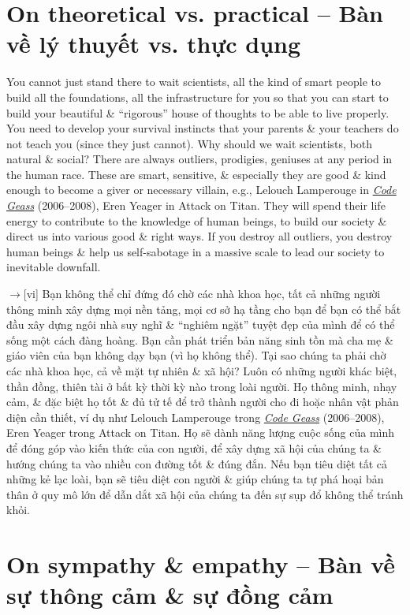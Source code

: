\documentclass[12pt,twoside]{book}
\begin{document}
\section{On theoretical vs. practical -- Bàn về lý thuyết vs. thực dụng}
You cannot just stand there to wait scientists, all the kind of smart people to build all the foundations, all the infrastructure for you so that you can start to build your beautiful \& ``rigorous'' house of thoughts to be able to live properly. You need to develop your survival instincts that your parents \& your teachers do not teach you (since they just cannot). Why should we wait scientists, both natural \& social? There are always outliers, prodigies, geniuses at any period in the human race. These are smart, sensitive, \& especially they are good \& kind enough to become a giver or necessary villain, e.g., {\sf Lelouch Lamperouge} in \href{https://www.imdb.com/title/tt0994314}{\it Code Geass} (2006--2008), {\sf Eren Yeager} in Attack on Titan. They will spend their life energy to contribute to the knowledge of human beings, to build our society \& direct us into various good \& right ways. If you destroy all outliers, you destroy human beings \& help us self-sabotage in a massive scale to lead our society to inevitable downfall.

{\sf[en]$\to$[vi]} Bạn không thể chỉ đứng đó chờ các nhà khoa học, tất cả những người thông minh xây dựng mọi nền tảng, mọi cơ sở hạ tầng cho bạn để bạn có thể bắt đầu xây dựng ngôi nhà suy nghĩ \& ``nghiêm ngặt'' tuyệt đẹp của mình để có thể sống một cách đàng hoàng. Bạn cần phát triển bản năng sinh tồn mà cha mẹ \& giáo viên của bạn không dạy bạn (vì họ không thể). Tại sao chúng ta phải chờ các nhà khoa học, cả về mặt tự nhiên \& xã hội? Luôn có những người khác biệt, thần đồng, thiên tài ở bất kỳ thời kỳ nào trong loài người. Họ thông minh, nhạy cảm, \& đặc biệt họ tốt \& đủ tử tế để trở thành người cho đi hoặc nhân vật phản diện cần thiết, ví dụ như {\sf Lelouch Lamperouge} trong \href{https://www.imdb.com/title/tt0994314}{\it Code Geass} (2006--2008), {\sf Eren Yeager} trong Attack on Titan. Họ sẽ dành năng lượng cuộc sống của mình để đóng góp vào kiến thức của con người, để xây dựng xã hội của chúng ta \& hướng chúng ta vào nhiều con đường tốt \& đúng đắn. Nếu bạn tiêu diệt tất cả những kẻ lạc loài, bạn sẽ tiêu diệt con người \& giúp chúng ta tự phá hoại bản thân ở quy mô lớn để dẫn dắt xã hội của chúng ta đến sự sụp đổ không thể tránh khỏi.

\section{On sympathy \& empathy -- Bàn về sự thông cảm \& sự đồng cảm}
\end{document}
